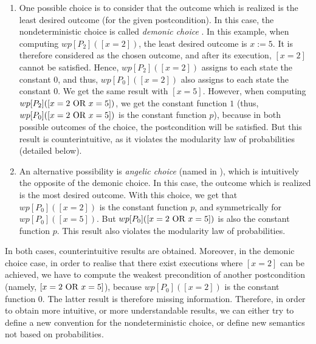 \documentclass[a4paper,10pt]{llncs}
\begin{document}
\begin{enumerate}
\item One possible choice is to consider that the outcome which is realized is the least desired outcome (for the given postcondition). In this case, the nondeterministic choice is called \emph{demonic choice} \cite{McIver05}. In this example, when computing $wp[P_2]([x = 2])$, the least desired outcome is $x := 5$. It is therefore considered as the chosen outcome, and after its execution, $[x = 2]$ cannot be satisfied. Hence, $wp[P_2]([x = 2])$ assigns to each state the constant $0$, and thus, $wp[P_0]([x = 2])$ also assigns to each state the constant $0$. We get the same result with $[x = 5]$. However, when computing $wp[P_2]([x = 2 \textnormal{ OR } x = 5])$, we get the constant function $1$ (thus, $wp[P_0]([x = 2 \textnormal{ OR } x = 5])$ is the constant function $p$), because in both possible outcomes of the choice, the postcondition will be satisfied. But this result is counterintuitive, as it violates the modularity law of probabilities (detailed below).
\item An alternative possibility is \emph{angelic choice} (named in \cite{McIver05}), which is intuitively the opposite of the demonic choice. In this case, the outcome which is realized is the most desired outcome. With this choice, we get that $wp[P_0]([x = 2])$ is the constant function $p$, and symmetrically for $wp[P_0]([x = 5])$. But $wp[P_0]([x = 2 \textnormal{ OR } x = 5])$ is also the constant function $p$. This result also violates the modularity law of probabilities.
\end{enumerate}
In both cases, counterintuitive results are obtained.
Moreover, in the demonic choice case, in order to realise that there exist executions where $[x=2]$ can be achieved, we have to compute the weakest precondition of another postcondition (namely, $[x = 2 \textnormal{ OR } x = 5]$), because $wp[P_0]([x = 2])$ is the constant function $0$. The latter result is therefore missing information. Therefore, in order to obtain more intuitive, or more understandable results, we can either try to define a new convention for the nondeterministic choice, or define new semantics not based on probabilities.\bigskip
\end{document}
